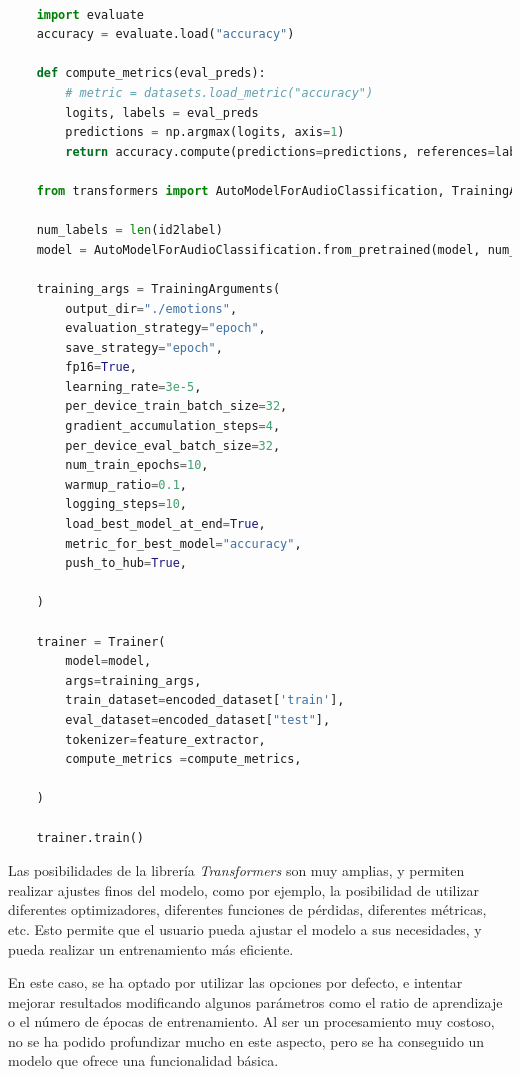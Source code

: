 \begin{lstlisting}[language=Python, caption=Entrenamiento del modelo, label={code:train-model}]

    import evaluate
    accuracy = evaluate.load("accuracy")

    def compute_metrics(eval_preds):
        # metric = datasets.load_metric("accuracy")
        logits, labels = eval_preds
        predictions = np.argmax(logits, axis=1)
        return accuracy.compute(predictions=predictions, references=labels)

    from transformers import AutoModelForAudioClassification, TrainingArguments, Trainer

    num_labels = len(id2label)
    model = AutoModelForAudioClassification.from_pretrained(model, num_labels=num_labels, label2id=label2id, id2label=id2label)

    training_args = TrainingArguments(
        output_dir="./emotions",
        evaluation_strategy="epoch",
        save_strategy="epoch",
        fp16=True,
        learning_rate=3e-5,
        per_device_train_batch_size=32,
        gradient_accumulation_steps=4,
        per_device_eval_batch_size=32,
        num_train_epochs=10,
        warmup_ratio=0.1,
        logging_steps=10,
        load_best_model_at_end=True,
        metric_for_best_model="accuracy",
        push_to_hub=True,

    )

    trainer = Trainer(
        model=model,
        args=training_args,
        train_dataset=encoded_dataset['train'],
        eval_dataset=encoded_dataset["test"],
        tokenizer=feature_extractor,
        compute_metrics =compute_metrics,

    )

    trainer.train()

\end{lstlisting}


Las posibilidades de la librería \textit{Transformers} son muy amplias, y permiten realizar ajustes finos del modelo, como por ejemplo, la posibilidad de utilizar diferentes optimizadores, diferentes funciones de pérdidas, diferentes métricas, etc.
Esto permite que el usuario pueda ajustar el modelo a sus necesidades, y pueda realizar un entrenamiento más eficiente.

En este caso, se ha optado por utilizar las opciones por defecto, e intentar mejorar resultados modificando algunos parámetros como el ratio de aprendizaje o el número de épocas de entrenamiento.
Al ser un procesamiento muy costoso, no se ha podido profundizar mucho en este aspecto, pero se ha conseguido un modelo que ofrece una funcionalidad básica.

